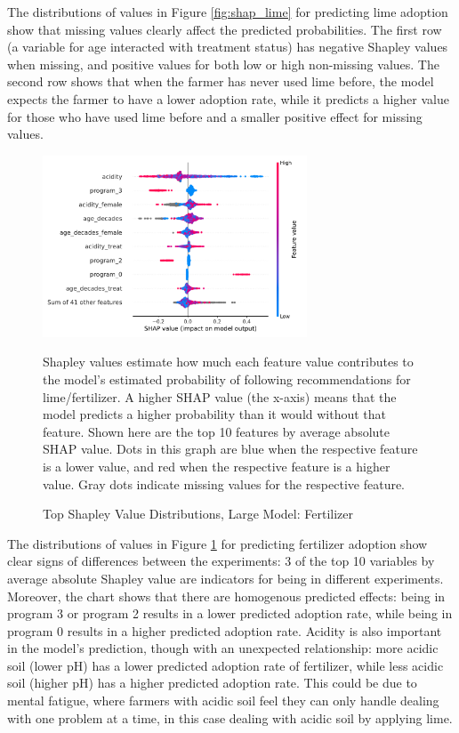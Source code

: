 \documentclass[12pt]{article}
\begin{document}
The distributions of values in Figure \ref{fig:shap_lime} for predicting lime adoption show that missing values clearly affect the predicted probabilities. The first row (a variable for age interacted with treatment status) has negative Shapley values when missing, and positive values for both low or high non-missing values. The second row shows that when the farmer has never used lime before, the model expects the farmer to have a lower adoption rate, while it predicts a higher value for those who have used lime before and a smaller positive effect for missing values.

\begin{figure}[H]
    \centering
    \caption{Top Shapley Value Distributions, Large Model: Fertilizer}
    \includegraphics[width=0.7\textwidth]{../output/shap_beeswarm_fert.pdf}
    \begin{minipage}{0.7\textwidth}
    \tiny
    Shapley values estimate how much each feature value contributes to the model's estimated probability of following recommendations for lime/fertilizer. A higher SHAP value (the x-axis) means that the model predicts a higher probability than it would without that feature. Shown here are the top 10 features by average absolute SHAP value. Dots in this graph are blue when the respective feature is a lower value, and red when the respective feature is a higher value. Gray dots indicate missing values for the respective feature.
    \end{minipage}
    \label{fig:shap_fert}
\end{figure}

The distributions of values in Figure \ref{fig:shap_fert} for predicting fertilizer adoption show clear signs of differences between the experiments: 3 of the top 10 variables by average absolute Shapley value are indicators for being in different experiments. Moreover, the chart shows that there are homogenous predicted effects: being in program 3 or program 2 results in a lower predicted adoption rate, while being in program 0 results in a higher predicted adoption rate. Acidity is also important in the model's prediction, though with an unexpected relationship: more acidic soil (lower pH) has a lower predicted adoption rate of fertilizer, while less acidic soil (higher pH) has a higher predicted adoption rate. This could be due to mental fatigue, where farmers with acidic soil feel they can only handle dealing with one problem at a time, in this case dealing with acidic soil by applying lime.
\end{document}
